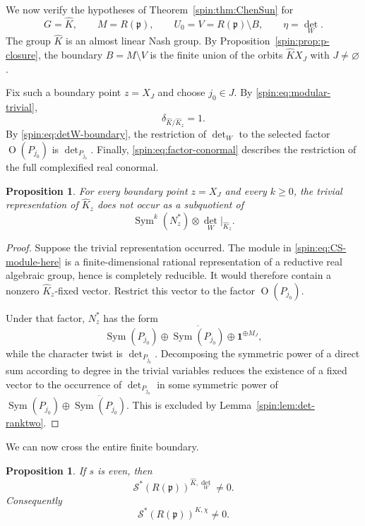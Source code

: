 \documentclass[11pt,reqno]{amsart}
\numberwithin{equation}{section}
\newtheorem{proposition}[theorem]{Proposition}
\theoremstyle{definition}
\theoremstyle{remark}
\newcommand{\Or}{\operatorname{O}}
\newcommand{\Sym}{\operatorname{Sym}}
\newcommand{\fp}{\mathfrak p}
\newcommand{\cS}{\mathcal S}
\begin{document}
We now verify the hypotheses of Theorem~\ref{spin:thm:ChenSun} for
\begin{equation}\label{spin:eq:CS-data}
  G=\widehat K,
  \qquad
  M=R(\fp),
  \qquad
  U_0=V=R(\fp)\setminus B,
  \qquad
  \eta=\det_W.
\end{equation}
The group $\widehat K$ is an almost linear Nash group.  By
Proposition~\ref{spin:prop:p-closure}, the boundary $B=M\setminus V$ is the finite
union of the orbits $\widehat KX_J$ with $J\ne\varnothing$.

Fix such a boundary point $z=X_J$ and choose $j_0\in J$.  By
\eqref{spin:eq:modular-trivial},
\[
  \delta_{\widehat K/\widehat K_z}=1.
\]
By \eqref{spin:eq:detW-boundary}, the restriction of $\det_W$ to the selected
factor $\Or(P_{j_0})$ is $\det_{P_{j_0}}$.  Finally,
\eqref{spin:eq:factor-conormal} describes the restriction of the full complexified
real conormal.

\begin{proposition}\label{spin:prop:CS-vanishing}
For every boundary point $z=X_J$ and every $k\ge0$, the trivial
representation of $\widehat K_z$ does not occur as a subquotient of
\begin{equation}\label{spin:eq:CS-module-here}
  \Sym^k(N_z^*)\otimes\det_W|_{\widehat K_z}.
\end{equation}
\end{proposition}

\begin{proof}
Suppose the trivial representation occurred.  The module in
\eqref{spin:eq:CS-module-here} is a finite-dimensional rational representation of a
reductive real algebraic group, hence is completely reducible.  It would
therefore contain a nonzero $\widehat K_z$-fixed vector.  Restrict this vector
to the factor $\Or(P_{j_0})$.

Under that factor, $N_z^*$ has the form
\[
  \Sym(P_{j_0})\oplus\overline{\Sym(P_{j_0})}
  \oplus\mathbf1^{\oplus M_J},
\]
while the character twist is $\det_{P_{j_0}}$.  Decomposing the symmetric
power of a direct sum according to degree in the trivial variables reduces the
existence of a fixed vector to the occurrence of $\det_{P_{j_0}}$ in some
symmetric power of
$\Sym(P_{j_0})\oplus\overline{\Sym(P_{j_0})}$.  This is excluded by
Lemma~\ref{spin:lem:det-ranktwo}.
\end{proof}

We can now cross the entire finite boundary.

\begin{proposition}\label{spin:prop:even-regular-distribution}
If $s$ is even, then
\begin{equation}\label{spin:eq:regular-sign-nonzero}
  \cS^*(R(\fp))^{\widehat K,\det_W}\ne0.
\end{equation}
Consequently
\[
  \cS^*(R(\fp))^{K,\chi}\ne0.
\]
\end{proposition}
\end{document}
